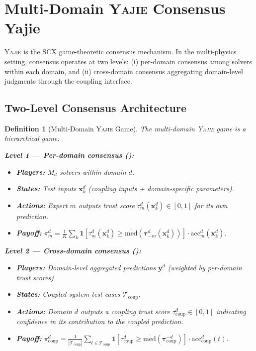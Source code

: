 \documentclass[11pt,a4paper]{article}
\newtheorem{definition}[theorem]{Definition}
\theoremstyle{definition}
\newcommand{\Yajie}{\textsc{Yajie}}
\newcommand{\SCX}{\textsc{SCX}}
\newcommand{\ind}[1]{\mathbf{1}[#1]}
\begin{document}
\section{Multi-Domain \Yajie{} Consensus Yajie}
\label{sec:yajie}

\Yajie{} is the \SCX{} game-theoretic consensus mechanism. In the multi-physics setting, consensus operates at two levels: (i) per-domain consensus among solvers within each domain, and (ii) cross-domain consensus aggregating domain-level judgments through the coupling interface.

\subsection{Two-Level Consensus Architecture }

\begin{definition}[Multi-Domain \Yajie{} Game]\label{def:yajie_mp}
The multi-domain \Yajie{} game is a hierarchical game:

\textbf{Level 1 --- Per-domain consensus ():}
\begin{itemize}
    \item \textbf{Players:} $M_d$ solvers within domain $d$.
    \item \textbf{States:} Test inputs $\mathbf{x}_k^d$ (coupling inputs + domain-specific parameters).
    \item \textbf{Actions:} Expert $m$ outputs trust score $\tau_m^d(\mathbf{x}_k^d) \in [0,1]$ for its own prediction.
    \item \textbf{Payoff:} $\pi_m^d = \frac{1}{K}\sum_k \ind{\tau_m^d(\mathbf{x}_k^d) \geq \overline{\mathrm{med}}(\boldsymbol{\tau}_{-m}^d(\mathbf{x}_k^d))} \cdot \mathrm{acc}_m^d(\mathbf{x}_k^d)$.
\end{itemize}

\textbf{Level 2 --- Cross-domain consensus ():}
\begin{itemize}
    \item \textbf{Players:} Domain-level aggregated predictions $\bar{\mathbf{y}}^d$ (weighted by per-domain trust scores).
    \item \textbf{States:} Coupled-system test cases $\mathcal{T}_{\mathrm{coup}}$.
    \item \textbf{Actions:} Domain $d$ outputs a coupling trust score $\tau_{\mathrm{coup}}^d \in [0,1]$ indicating confidence in its contribution to the coupled prediction.
    \item \textbf{Payoff:} $\pi_{\mathrm{coup}}^d = \frac{1}{|\mathcal{T}_{\mathrm{coup}}|}\sum_{t \in \mathcal{T}_{\mathrm{coup}}} \ind{\tau_{\mathrm{coup}}^d \geq \overline{\mathrm{med}}(\boldsymbol{\tau}_{\mathrm{coup}}^{-d})} \cdot \mathrm{acc}_{\mathrm{coup}}^d(t)$.
\end{itemize}
\end{definition}
\end{document}

